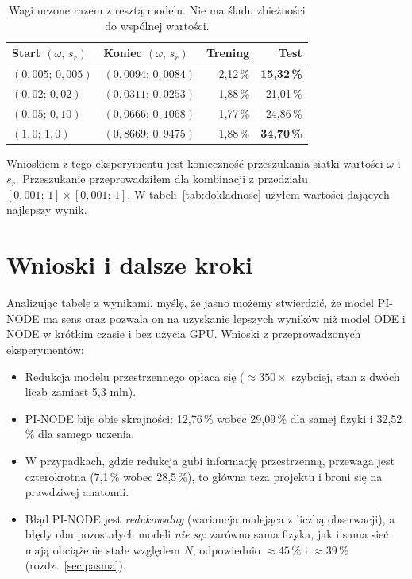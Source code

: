 \documentclass[11pt,a4paper]{article}
\begin{document}
\begin{table}[H]
\centering\footnotesize
\setlength{\tabcolsep}{6pt}
\begin{tabular}{@{}llrr@{}}
\toprule
\textbf{Start} $(\omega,\,s_r)$ & \textbf{Koniec} $(\omega,\,s_r)$ &
\textbf{Trening} & \textbf{Test} \\
\midrule
$(0{,}005;\,0{,}005)$ & $(0{,}0094;\,0{,}0084)$ & 2,12\,\% & \textbf{15,32\,\%} \\
$(0{,}02;\,0{,}02)$   & $(0{,}0311;\,0{,}0253)$ & 1,88\,\% & 21,01\,\% \\
$(0{,}05;\,0{,}10)$   & $(0{,}0666;\,0{,}1068)$ & 1,77\,\% & 24,86\,\% \\
$(1{,}0;\,1{,}0)$     & $(0{,}8669;\,0{,}9475)$ & 1,88\,\% & \textbf{34,70\,\%} \\
\bottomrule
\end{tabular}
\caption{Wagi uczone razem z resztą modelu. Nie ma śladu
zbieżności do wspólnej wartości.}
\label{tab:uczone-wagi}
\end{table}

Wnioskiem z tego eksperymentu jest konieczność przeszukania siatki wartości $\omega$ i $s_r$. Przeszukanie przeprowadziłem dla kombinacji z przedziału $[0{,}001;\,1] \times [0{,}001;\,1]$. W tabeli~\ref{tab:dokladnosc} użyłem wartości dających najlepszy wynik.

\section{Wnioski i dalsze kroki}
\label{sec:wnioski}

Analizując tabele z wynikami, myślę, że jasno możemy stwierdzić, że model PI-NODE ma sens oraz pozwala on na uzyskanie lepszych wyników niż model ODE i NODE w krótkim czasie i bez użycia GPU. Wnioski z przeprowadzonych eksperymentów:


\begin{itemize}
\item Redukcja modelu przestrzennego opłaca się ($\approx 350\times$ szybciej, stan
z dwóch liczb zamiast 5,3 mln).

\item PI-NODE bije obie skrajności: 12,76\,\% wobec 29,09\,\% dla samej fizyki
i 32,52\,\% dla samego uczenia.

\item W przypadkach, gdzie redukcja gubi informację przestrzenną, przewaga jest czterokrotna
(7,1\,\% wobec 28,5\,\%), to główna teza projektu i broni się na prawdziwej anatomii.

\item Błąd PI-NODE jest \emph{redukowalny} (wariancja malejąca z liczbą obserwacji),
a błędy obu pozostałych modeli \emph{nie są}: zarówno sama fizyka, jak i sama sieć mają
obciążenie stałe względem $N$, odpowiednio $\approx 45\,\%$ i $\approx 39\,\%$
(rozdz.~\ref{sec:pasma}).

\end{itemize}
\end{document}
